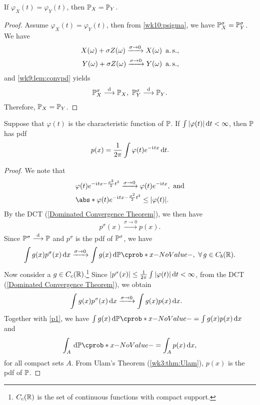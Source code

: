 \documentclass[12pt]{article}
\begin{document}
\begin{Lemma}[Uniqueness]\label{wk10:Lemma2}
If $\varphi_X(t)=\varphi_Y(t)$, then $\P_X =\P_Y$.
\end{Lemma}
\begin{proof}
Assume $\varphi_X(t)=\varphi_Y(t)$, then from \cref{wk10:psigma}, we have $\P_X^{\sigma}=\P_Y^{\sigma}$. We have
\begin{align*}
X(\omega)+\sigma Z(\omega)\xrightarrow{\sigma\to 0}X(\omega)\ \operatorname{a.s.},\\
Y(\omega)+\sigma Z(\omega)\xrightarrow{\sigma\to 0}Y(\omega)\ \operatorname{a.s.},
\end{align*}
and \cref{wk9:lem:convpd} yields
\begin{align*}
\P^{\sigma}_{X}\convd \P_X,\
\P^{\sigma}_{Y}\convd \P_Y.
\end{align*}
Therefore, $\P_X=\P_Y$.
\end{proof}
%
\begin{Lemma}\label{wk10:Lemma3}
Suppose that $\varphi(t)$ is the characteristic function of $\P$. If $\int |\varphi(t)| \,\mathrm{d} t <\infty$, then $\P$ has pdf 
\begin{align*}
p(x)=\frac{1}{2\pi}\int \varphi(t) e^{-\mathfrak{i}\mkern1mu tx} \,\mathrm{d} t.
\end{align*}
\end{Lemma}
\begin{proof}
We note that
\begin{align*}
&\varphi(t) e^{-\iu tx-\frac{\sigma^2}{2}t^2} \xrightarrow{\sigma \to 0} \varphi(t)e^{-\iu tx}, \text{ and}\\
&\abs*{\varphi(t) e^{-\iu tx-\frac{\sigma^2}{2}t^2}}	\leq |\varphi(t)|.\\
\end{align*}
By the DCT (\cref{Dominated Convergence Theorem}), we then have
\begin{align*}
p^{\sigma}(x)\xrightarrow{\sigma \to 0} p(x).
\end{align*}
Since $\P^{\sigma}\convd \P$ and $p^\sigma$ is the pdf of $\P^\sigma$, we have 
\begin{align}\label{p1}
\int g(x) p^{\sigma}(x)\ud x \xrightarrow{\sigma \to 0} \int g(x) \ud\P(x),\ \forall g \in C_b(\Real).
\end{align}
Now consider a $g\in C_c(\mathbb{R})$.\footnote{$C_c(\mathbb{R})$ is the set of continuous functions with compact support.} Since $|p^{\sigma}(x)| \leq  \frac{1}{2\pi} \int |\varphi(t)|\,\mathrm{d} t < \infty $, from the DCT (\cref{Dominated Convergence Theorem}), we obtain
\begin{align*}
\int g(x) p^{\sigma}(x)\,\mathrm{d} x 	&\xrightarrow{\sigma \to 0} \int g(x) p(x)\,\mathrm{d} x.
\end{align*}
Together with \cref{p1}, we have $\int g(x) \ud\P(x) = \int g(x)p(x)\ud x$ and
\begin{align*}
\int_A \ud \P(x)=\int_A p(x) \ud x,
\end{align*}
for all compact sets $A$. From Ulam's Theorem (\cref{wk3:thm:Ulam}), $p(x)$ is the pdf of $\P$.
\end{proof}
\end{document}
